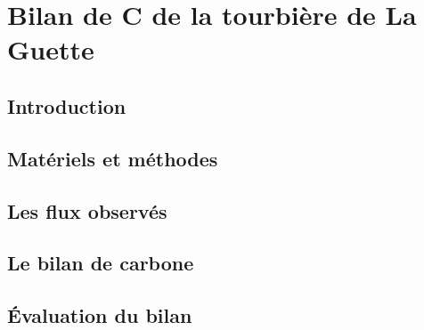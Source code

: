 \chapter{Bilan de C de la tourbière de La Guette}
\newpage

\section{Introduction}

\section{Matériels et méthodes}

\section{Les flux observés}

\section{Le bilan de carbone}

\section{Évaluation du bilan}